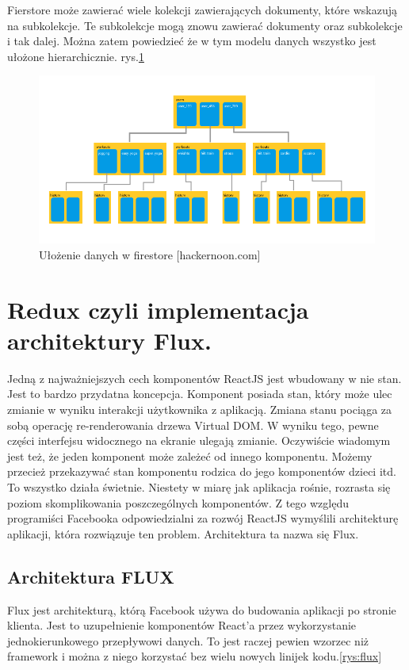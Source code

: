 Fierstore może zawierać wiele kolekcji zawierających dokumenty, które wskazują na subkolekcje.
Te subkolekcje mogą znowu zawierać dokumenty oraz subkolekcje i tak dalej.
Można zatem powiedzieć że w tym modelu danych wszystko jest ułożone hierarchicznie.\cite{www_hakermoon}
rys.\ref{rys:firestoreTree}

\begin{figure}
	\centering\includegraphics[width=.6\textwidth]{img/firestoreTree}
	\caption{Ułożenie danych w firestore [hackernoon.com]}\label{rys:firestoreTree}%
\end{figure}

\section{Redux czyli implementacja architektury Flux.}

Jedną z najważniejszych cech komponentów ReactJS jest wbudowany w nie stan.
Jest to bardzo przydatna koncepcja. Komponent posiada stan,
który może ulec zmianie w wyniku interakcji użytkownika z aplikacją.
Zmiana stanu pociąga za sobą operację re-renderowania drzewa Virtual DOM\@.
W wyniku tego, pewne części interfejsu widocznego na ekranie ulegają zmianie.
Oczywiście wiadomym jest też, że jeden komponent może zależeć od innego komponentu.
Możemy przecież przekazywać stan komponentu rodzica do jego komponentów dzieci itd.
To wszystko działa świetnie. Niestety w miarę jak aplikacja rośnie, rozrasta się poziom skomplikowania poszczególnych komponentów.
Z tego względu programiści Facebooka odpowiedzialni za rozwój ReactJS wymyślili architekturę aplikacji, która rozwiązuje ten problem.
Architektura ta nazwa się Flux.\cite{www_nafrontendzie}

\subsection{Architektura FLUX}

Flux jest architekturą, którą Facebook używa do budowania aplikacji po stronie klienta.
Jest to uzupełnienie komponentów React’a przez wykorzystanie jednokierunkowego przepływowi danych.
To jest raczej pewien wzorzec niż framework i można z niego korzystać  bez wielu nowych linijek kodu.\ref{rys:flux}

